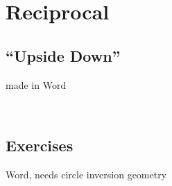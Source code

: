 \newpage
\noindent{}



\newpage
\section{Reciprocal}
\subsection{``Upside Down''}
made in Word
\newpage

~\vfill
\newpage
\subsection{Exercises}
Word, needs circle inversion geometry
~\vfill


